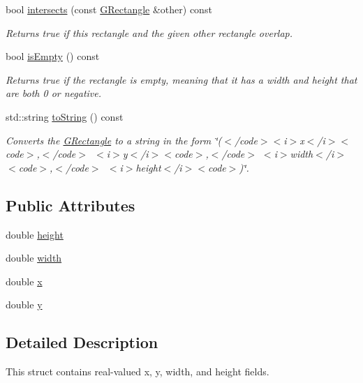\begin{DoxyCompactItemize}
bool \mbox{\hyperlink{structsgl_1_1GRectangle_aea079d10c5a74c6e7c83b44a44357b42}{intersects}} (const \mbox{\hyperlink{structsgl_1_1GRectangle}{G\+Rectangle}} \&other) const
\begin{DoxyCompactList}\small\item\em Returns true if this rectangle and the given other rectangle overlap. \end{DoxyCompactList}\item 
bool \mbox{\hyperlink{structsgl_1_1GRectangle_acf82f9b2937375c7b1cf3dccb3df3312}{is\+Empty}} () const
\begin{DoxyCompactList}\small\item\em Returns {\ttfamily true} if the rectangle is empty, meaning that it has a width and height that are both 0 or negative. \end{DoxyCompactList}\item 
std\+::string \mbox{\hyperlink{structsgl_1_1GRectangle_a1fe5121d6528fdea3f243321b3fa3a49}{to\+String}} () const
\begin{DoxyCompactList}\small\item\em Converts the {\ttfamily \mbox{\hyperlink{structsgl_1_1GRectangle}{G\+Rectangle}}} to a string in the form {\ttfamily \char`\"{}($<$/code$>$$<$i$>$x$<$/i$>$$<$code$>$,$<$/code$>$~$<$i$>$y$<$/i$>$$<$code$>$,$<$/code$>$
$<$i$>$width$<$/i$>$$<$code$>$,$<$/code$>$~$<$i$>$height$<$/i$>$$<$code$>$)\char`\"{}}. \end{DoxyCompactList}\end{DoxyCompactItemize}
\subsection*{Public Attributes}
\begin{DoxyCompactItemize}
\item 
double \mbox{\hyperlink{structsgl_1_1GRectangle_a89f6abd564014faeff7cd20c340a9c7d}{height}}
\item 
double \mbox{\hyperlink{structsgl_1_1GRectangle_a9df23e056f5d1a0388cd8190431c0e03}{width}}
\item 
double \mbox{\hyperlink{structsgl_1_1GRectangle_af88b946fb90d5f08b5fb740c70e98c10}{x}}
\item 
double \mbox{\hyperlink{structsgl_1_1GRectangle_ab927965981178aa1fba979a37168db2a}{y}}
\end{DoxyCompactItemize}


\subsection{Detailed Description}
This struct contains real-\/valued x, y, width, and height fields. 

